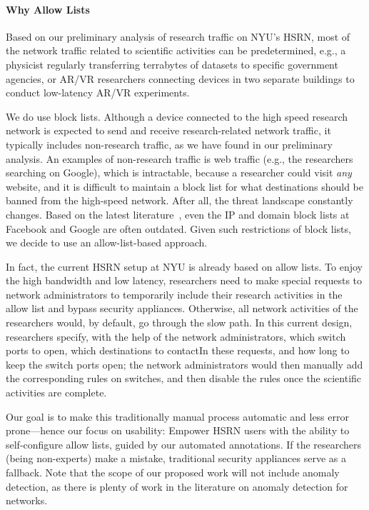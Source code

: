 \paragraph{Why Allow Lists}
Based on our preliminary analysis of research traffic on NYU's HSRN, most of the network traffic related to scientific activities can be predetermined, e.g., a physicist regularly transferring terrabytes of datasets to specific government agencies, or AR/VR researchers connecting devices in two separate buildings to conduct low-latency AR/VR experiments.

We do use block lists. Although a device connected to the high speed research network is expected to send and receive research-related network traffic, it typically includes non-research traffic, as we have found in our preliminary analysis. An examples of non-research traffic is web traffic (e.g., the researchers searching on Google), which is intractable, because a researcher could visit \textit{any} website, and it is difficult to maintain a block list for what destinations should be banned from the high-speed network. After all, the threat landscape constantly changes. Based on the latest literature~\cite{235461}, even the IP and domain block lists at Facebook and Google are often outdated. Given such restrictions of block lists, we decide to use an allow-list-based approach.

In fact, the current HSRN setup at NYU is already based on allow lists. To enjoy the high bandwidth and low latency, researchers need to make special requests to network administrators to temporarily include their research activities in the allow list and bypass security appliances. Otherwise, all network activities of the researchers would, by default, go through the slow path. In this current design, researchers specify, with the help of the network administrators, which switch ports to open, which destinations to contactIn these requests, and how long to keep the switch ports open; the network administrators would then manually add the corresponding rules on switches, and then disable the rules once the scientific activities are complete.

Our goal is to make this traditionally manual process automatic and less error prone---hence our focus on usability: Empower HSRN users with the ability to self-configure allow lists, guided by our automated annotations. If the researchers (being non-experts) make a mistake, traditional security appliances serve as a fallback. Note that the scope of our proposed work will not include anomaly detection, as there is plenty of work in the literature on anomaly detection for networks.


